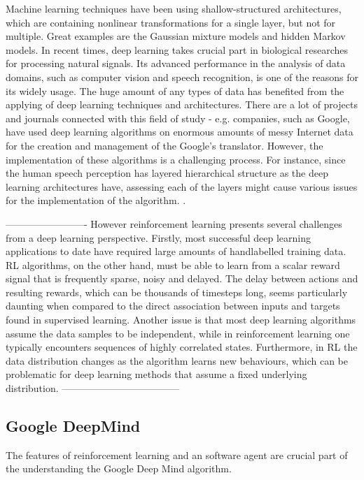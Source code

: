 \documentclass{article}
\begin{document}
Machine learning techniques have been using shallow-structured architectures, which are containing nonlinear transformations for a single layer, but not for multiple. Great examples are the Gaussian mixture models and hidden Markov models\cite{deng2012three}. In recent times, deep learning takes crucial part in biological researches for processing natural signals. Its advanced performance in the analysis of data domains, such as computer vision and speech recognition, is one of the reasons for its widely usage. The huge amount of any types of data has benefited from the applying of deep learning techniques and architectures. There are a lot of projects and journals connected with this field of study - e.g. companies, such as Google, have used deep learning algorithms on enormous amounts of messy Internet data for the creation and management of the Google's translator\cite{deng2012three}. However, the implementation of these algorithms is a challenging process. For instance, since the human speech perception has layered hierarchical structure as the deep learning architectures have, assessing each of the layers might cause various issues for the implementation of the algorithm. \cite{deng2012three}.

-------------------------
However reinforcement learning presents several challenges from a deep learning perspective.
Firstly, most successful deep learning applications to date have required large amounts of handlabelled
training data. RL algorithms, on the other hand, must be able to learn from a scalar reward
signal that is frequently sparse, noisy and delayed. The delay between actions and resulting rewards,
which can be thousands of timesteps long, seems particularly daunting when compared to the direct
association between inputs and targets found in supervised learning. Another issue is that most deep
learning algorithms assume the data samples to be independent, while in reinforcement learning one
typically encounters sequences of highly correlated states. Furthermore, in RL the data distribution
changes as the algorithm learns new behaviours, which can be problematic for deep learning
methods that assume a fixed underlying distribution.\cite{mnih2013playing}
------------------------------------

\subsection{Google DeepMind}
The features of reinforcement learning and an software agent are crucial part of the understanding the Google Deep Mind algorithm.
\end{document}
